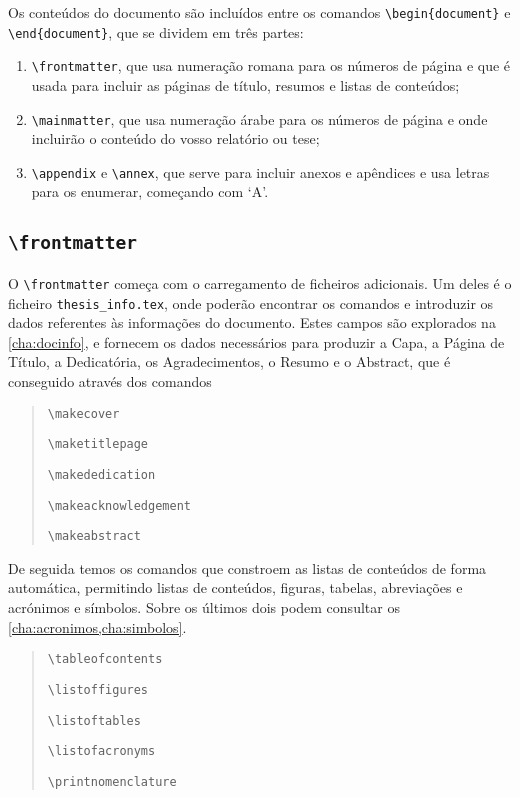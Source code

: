 Os conteúdos do documento são incluídos entre os comandos \texttt{\textbackslash begin\{document\}} e \texttt{\textbackslash end\{document\}}, que se dividem em três partes:
\begin{enumerate}
\item\texttt{\textbackslash frontmatter}, que usa numeração romana para os números de página e que é usada para incluir as páginas de título, resumos e listas de conteúdos;
\item\texttt{\textbackslash mainmatter}, que usa numeração árabe para os números de página e onde incluirão o conteúdo do vosso relatório ou tese;
\item\texttt{\textbackslash appendix} e \texttt{\textbackslash annex}, que serve para incluir anexos e apêndices e usa letras para os enumerar, começando com `A'.
\end{enumerate}

\subsection{\texttt{\textbackslash frontmatter}}

O \texttt{\textbackslash frontmatter} começa com o carregamento de ficheiros adicionais. Um deles é o ficheiro \texttt{thesis\_info.tex}, onde poderão encontrar os comandos e introduzir os dados referentes às informações do documento. Estes campos são explorados na \cref{cha:docinfo}, e fornecem os dados necessários para produzir a Capa, a Página de Título, a Dedicatória, os Agradecimentos, o Resumo e o Abstract, que é conseguido através dos comandos
\begin{quote}
    \texttt{\textbackslash makecover}

    \texttt{\textbackslash maketitlepage}

    \texttt{\textbackslash makededication}

    \texttt{\textbackslash makeacknowledgement}

    \texttt{\textbackslash makeabstract}
\end{quote}

De seguida temos os comandos que constroem as listas de conteúdos de forma automática, permitindo listas de conteúdos, figuras, tabelas, abreviações e acrónimos e símbolos. Sobre os últimos dois podem consultar os \cref{cha:acronimos,cha:simbolos}.

\begin{quote}
    \texttt{\textbackslash tableofcontents}

    \texttt{\textbackslash listoffigures}

    \texttt{\textbackslash listoftables}

    \texttt{\textbackslash listofacronyms}

    \texttt{\textbackslash printnomenclature}
\end{quote}

